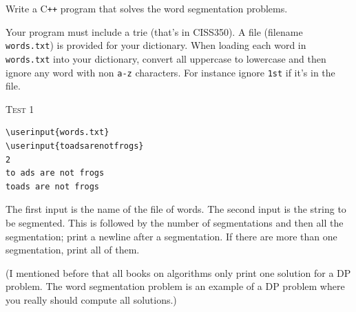 Write a C\texttt{++} program that solves the word segmentation problems.

Your program must include a trie (that's in CISS350).
A file (filename \verb!words.txt!)
is provided for your dictionary.
When loading each word in \verb!words.txt! into your dictionary,
convert all uppercase to lowercase and then ignore any word with non \verb!a-z! characters.
For instance ignore \verb!1st! if it's in the file.

\textsc{Test 1}
\begin{Verbatim}[frame=single,commandchars=\\\{\}]
\userinput{words.txt}
\userinput{toadsarenotfrogs}
2
to ads are not frogs
toads are not frogs
\end{Verbatim}
The first input is the name of the file of words.
The second input is the string to be segmented.
This is followed by the number of segmentations
and then all the segmentation; print a newline after a segmentation.
If there are more than one segmentation, print all of them.

(I mentioned before that all books on algorithms only
print one solution for a DP problem.
The word segmentation problem is an example of a DP problem where
you really should compute all solutions.)
